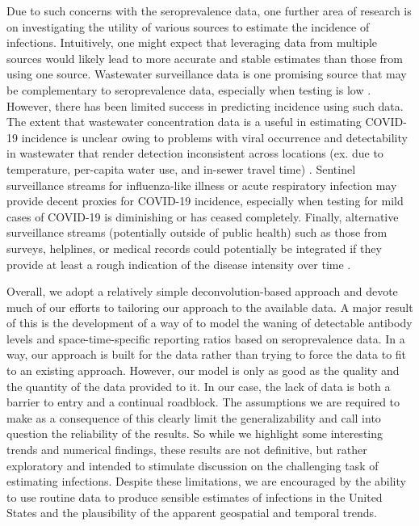 \documentclass{article}
\begin{document}
Due to such concerns with the seroprevalence data, one further area of research
is on investigating the utility of various sources to estimate the incidence of
infections. Intuitively, one might expect that leveraging data from multiple
sources would likely lead to more accurate and stable estimates than those from
using one source. Wastewater surveillance data is one
promising source that may be complementary to seroprevalence data, especially
when testing is low \citep{mcmanus2023predicting}. However, there has been
limited success in predicting incidence using such data. The extent that
wastewater concentration data is a useful in estimating COVID-19 incidence is
unclear owing to problems with viral occurrence and detectability in wastewater
that render detection inconsistent across locations (ex. due to temperature,
per-capita water use, and in-sewer travel time) \citep{mcmanus2023predicting,
hart2020computational, li2023correlation}. Sentinel surveillance streams for
influenza-like illness or acute respiratory infection may provide decent proxies
for COVID-19 incidence, especially when testing for mild cases of COVID-19 is
diminishing or has ceased completely. Finally, alternative surveillance streams
(potentially outside of public health) such as those from surveys, helplines, or
medical records could potentially be integrated if they provide at least a rough
indication of the disease intensity over time \citep{ecdc2020strategies}.

Overall, we adopt a relatively simple deconvolution-based approach and devote
much of our efforts to tailoring our approach to the available data. A
major result of this is the development of a way of to model the waning
of detectable antibody levels and space-time-specific reporting ratios based on
 seroprevalence data. In a way, our approach is built for the data rather than trying to force 
 the data to fit to an existing approach. However, our model is only as good as the quality and
the quantity of the data provided to it. In our case, the lack of data is both a barrier to entry
and a continual roadblock. The assumptions we are required to make as a
consequence of this clearly limit the generalizability and call into question
the reliability of the results. So while we highlight some interesting trends and
numerical findings, these results are not definitive, but rather exploratory and
intended to stimulate discussion on the challenging task of estimating
infections. Despite these limitations, we are encouraged by the ability to use
routine data to produce sensible estimates of infections in the United States and the
plausibility of the apparent geospatial and temporal trends. 
 
\end{document}
